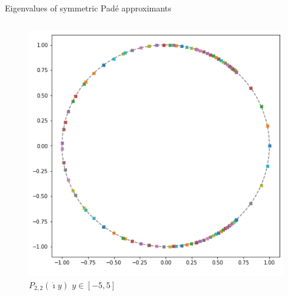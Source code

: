 \documentclass{beamer}
\newcommand{\I}{\dot{\imath}}
\begin{document}
\begin{frame}{Eigenvalues of symmetric Padé approximants}
  \begin{columns}
    \begin{column}{\textwidth}
      \begin{figure}\centering \includegraphics[height=0.75\textheight]{img/P22_ev} \caption{$P_{2,2}(\I y)$ $y\in[-5,5]$}\end{figure}
    \end{column}
  \end{columns}
\end{frame}

\end{document}
